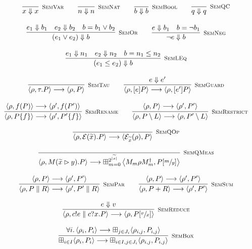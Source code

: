   \begin{gather*}
    \infer[\mbox{\footnotesize\scshape SemVar}]{x \Downarrow x}{} \qquad
    \infer[\mbox{\footnotesize\scshape SemNat}]{n \Downarrow n}{} \qquad
    \infer[\mbox{\footnotesize\scshape SemBool}]{b \Downarrow b}{}  \qquad
    \infer[\mbox{\footnotesize\scshape SemQC}]{q \Downarrow q}{} \\[0.3cm]
    \infer[\mbox{\footnotesize\scshape SemOr}]{(e_1 \lor e_2) \Downarrow b}{e_1 \Downarrow b_1 & e_2 \Downarrow b_2 & b = b_1 \lor b_2} \qquad
    \infer[\mbox{\footnotesize\scshape SemNeg}]{\neg e \Downarrow b}{e \Downarrow b_1 & b = \neg b_1} \\[0.3cm]
    \infer[\mbox{\footnotesize\scshape SemLEq}]{(e_1 \leq e_2) \Downarrow b}{e_1 \Downarrow n_1 & e_2 \Downarrow n_2 & b = n_1 \leq n_2} \\[0.3cm]
    \infer[\mbox{\footnotesize\scshape SemTau}]{\langle \rho, \tau . P \rangle \longrightarrow \langle \rho, P \rangle}{} \qquad
    \infer[\mbox{\footnotesize\scshape SemGuard}]{\langle \rho, [e] P \rangle \longrightarrow \langle \rho, [e'] P \rangle}{e \Downarrow e'} \\[0.3cm]
    \infer[\mbox{\footnotesize\scshape SemRename}]{\langle \rho, P \{f\} \rangle \longrightarrow \langle \rho', P' \{f\}\rangle}{\langle \rho, f(P) \rangle \longrightarrow \langle \rho', f(P') \rangle} \qquad
    \infer[\mbox{\footnotesize\scshape SemRestrict}]{\langle \rho, P \setminus L \rangle \longrightarrow \langle \rho, P' \setminus L \rangle}{\langle \rho, P \rangle \longrightarrow \langle \rho', P' \rangle} \\[0.3cm]
    \infer[\mbox{\footnotesize\scshape SemQOp}]{\langle \rho, \mathcal{E}(\widetilde{x}) . P \rangle \longrightarrow \langle \mathcal{E}_{\widetilde{x}}(\rho), P \rangle}{} \\[0.3cm]
    \infer[\mbox{\footnotesize\scshape SemQMeas}]{\langle \rho, M(\widetilde{x} \rhd y) . P \rangle \longrightarrow \boxplus_{m = 0}^{2^{|\widetilde{x}|}} \left\langle {M_m \rho M_m^\dag}, P[\sfrac{m}{y}] \right\rangle}{} \\[0.3cm]
    \infer[\mbox{\footnotesize\scshape SemPar}]{\langle \rho, P \parallel R \rangle \longrightarrow \langle \rho', P' \parallel R \rangle}{\langle \rho, P \rangle \longrightarrow \langle \rho', P' \rangle} \qquad
    \infer[\mbox{\footnotesize\scshape SemSum}]{\langle \rho, P + R \rangle \longrightarrow \langle \rho', P' \rangle}{\langle \rho, P \rangle \longrightarrow \langle \rho', P' \rangle} \\[0.3cm]
    \infer[\mbox{\footnotesize\scshape SemReduce}]{\langle \rho, c!e \parallel c?x . P \rangle \longrightarrow \langle \rho, P[\sfrac{v}{x}] \rangle}{e \Downarrow v} \\[0.3cm]
    \infer[\mbox{\footnotesize\scshape SemBox}]{\boxplus_{i \in I}\langle \rho_i, P_i \rangle \longrightarrow \boxplus_{i \in I, j \in J_i}\langle \rho_{i, j},P_{i, j} \rangle}
          {\forall i \ldotp \langle \rho_i, P_i \rangle \longrightarrow \boxplus_{j \in J_i} \langle\rho_{i, j},P_{i, j}\rangle}
  \end{gather*}
  
